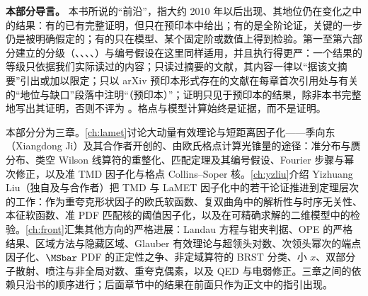 \noindent\textbf{本部分导言。}
本书所说的“前沿”，指大约 2010 年以后出现、其地位仍在变化之中的结果：有的已有完整证明，但只在预印本中给出；有的是全阶论证，关键的一步仍是被明确假定的；有的只在模型、某个固定阶或数值上得到检验。第一至第六部分建立的分级（\tagR、\tagA、\tagP、\tagC、\tagV）与编号假设在这里同样适用，并且执行得更严：一个结果的等级只依据我们实际读过的内容；只读过摘要的文献，其内容一律以“据该文摘要”引出或加以限定；只以 arXiv 预印本形式存在的文献在每章首次引用处与有关的“地位与缺口”段落中注明“（预印本）”；证明只见于预印本的结果，除非本书完整地写出其证明，否则不评为 \tagR。格点与模型计算始终是证据，而不是证明。

本部分分为三章。\cref{ch:lamet}讨论大动量有效理论与短距离因子化——季向东（Xiangdong Ji）及其合作者开创的、由欧氏格点计算光锥量的途径：准分布与赝分布、类空 Wilson 线算符的重整化、匹配定理及其编号假设、Fourier 步骤与幂次修正，以及准 TMD 因子化与格点 Collins--Soper 核。\cref{ch:yzliu}介绍 Yizhuang Liu（独自及与合作者）把 TMD 与 LaMET 因子化中的若干论证推进到定理层次的工作：作为重夸克形状因子的欧氏软函数、复双曲角中的解析性与时序无关性、本征软函数、准 PDF 匹配核的阈值因子化，以及在可精确求解的二维模型中的检验。\cref{ch:front}汇集其他方向的严格进展：Landau 方程与钳夹判据、OPE 的严格结果、区域方法与隐藏区域、Glauber 有效理论与超领头对数、次领头幂次的端点因子化、$\MSbar$ PDF 的正定性之争、非定域算符的 BRST 分类、小 $x$、双部分子散射、喷注与非全局对数、重夸克偶素，以及 QED 与电弱修正。三章之间的依赖只沿书的顺序进行；后面章节中的结果在前面只作为正文中的指引出现。

